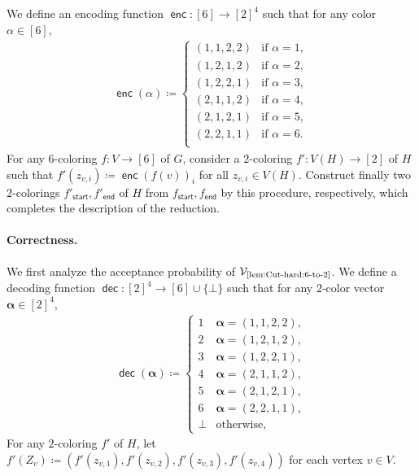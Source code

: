 \documentclass[11pt,fleqn]{article}
\newcommand{\defeq}{\coloneq}
\DeclareMathOperator{\enc}{\mathsf{enc}}
\DeclareMathOperator{\dec}{\mathsf{dec}}
\newcommand{\sss}{\mathsf{start}}
\newcommand{\ttt}{\mathsf{end}}
\newcommand{\V}{\calV}
\newcommand{\f}{f}
\newcommand{\Vsix}{\V_{\text{\ref{lem:Cut-hard:6-to-2}}}}
\newcommand{\calV}{\mathcal{V}}
\theoremstyle{definition}
\numberwithin{equation}{section}
\begin{document}
We define an encoding function $\enc \colon [6] \to [2]^4$ such that
for any color $\alpha \in [6]$,
\begin{align}
    \enc(\alpha) \defeq
    \begin{cases}
        (1,1,2,2) & \text{if } \alpha = 1, \\
        (1,2,1,2) & \text{if } \alpha = 2, \\
        (1,2,2,1) & \text{if } \alpha = 3, \\
        (2,1,1,2) & \text{if } \alpha = 4, \\
        (2,1,2,1) & \text{if } \alpha = 5, \\
        (2,2,1,1) & \text{if } \alpha = 6. \\
    \end{cases}
\end{align}
For any $6$-coloring $\f \colon V \to [6]$ of $G$,
consider a $2$-coloring $\f' \colon V(H) \to [2]$ of $H$ such that
$\f'(z_{v,i}) \defeq \enc(\f(v))_i$ for all $z_{v,i} \in V(H)$.
Construct finally two $2$-colorings $\f'_\sss,\f'_\ttt$ of $H$ from $\f_\sss,\f_\ttt$ by this procedure, respectively,
which completes the description of the reduction.

\paragraph{Correctness.}
We first analyze the acceptance probability of $\Vsix$.
We define a decoding function $\dec \colon [2]^4 \to [6] \cup \{\bot\}$ such that
for any $2$-color vector $\bm{\alpha} \in [2]^4$,
\begin{align}
    \dec(\bm{\alpha}) \defeq
    \begin{cases}
        1 & \bm{\alpha}=(1,1,2,2), \\
        2 & \bm{\alpha}=(1,2,1,2), \\
        3 & \bm{\alpha}=(1,2,2,1), \\
        4 & \bm{\alpha}=(2,1,1,2), \\
        5 & \bm{\alpha}=(2,1,2,1), \\
        6 & \bm{\alpha}=(2,2,1,1), \\
        \bot & \text{otherwise},
    \end{cases}
\end{align}
For any $2$-coloring $\f'$ of $H$,
let $\f'(Z_v) \defeq (\f'(z_{v,1}), \f'(z_{v,2}), \f'(z_{v,3}), \f'(z_{v,4}))$
for each vertex $v \in V$.
\end{document}
